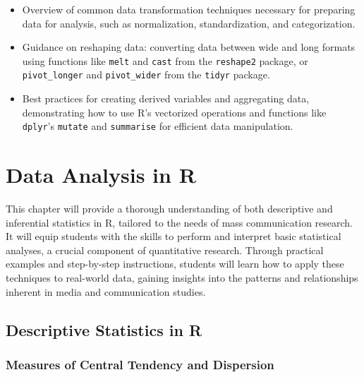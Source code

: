 \documentclass[
]{book}
\begin{document}
\begin{itemize}
\item
  Overview of common data transformation techniques necessary for preparing data for analysis, such as normalization, standardization, and categorization.
\item
  Guidance on reshaping data: converting data between wide and long formats using functions like \texttt{melt} and \texttt{cast} from the \texttt{reshape2} package, or \texttt{pivot\_longer} and \texttt{pivot\_wider} from the \texttt{tidyr} package.
\item
  Best practices for creating derived variables and aggregating data, demonstrating how to use R's vectorized operations and functions like \texttt{dplyr}'s \texttt{mutate} and \texttt{summarise} for efficient data manipulation.
\end{itemize}

\hypertarget{data-analysis-in-r}{%
\chapter*{Data Analysis in R}\label{data-analysis-in-r}}

This chapter will provide a thorough understanding of both descriptive and inferential statistics in R, tailored to the needs of mass communication research. It will equip students with the skills to perform and interpret basic statistical analyses, a crucial component of quantitative research. Through practical examples and step-by-step instructions, students will learn how to apply these techniques to real-world data, gaining insights into the patterns and relationships inherent in media and communication studies.

\hypertarget{descriptive-statistics-in-r}{%
\section*{Descriptive Statistics in R}\label{descriptive-statistics-in-r}}

\hypertarget{measures-of-central-tendency-and-dispersion}{%
\subsection*{Measures of Central Tendency and Dispersion}\label{measures-of-central-tendency-and-dispersion}}
\end{document}
